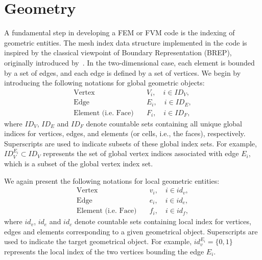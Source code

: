 \section{Geometry}
A fundamental step in developing a FEM or FVM code
is the indexing of geometric entities.
The mesh index data structure implemented in the code is inspired by the classical 
viewpoint of Boundary Representation (BREP), 
originally introduced by~\cite{10.1145/1499949.1500071}.
In the two-dimensional case,
each element is bounded by a set of edges,
and each edge is defined by a set of vertices.
We begin by introducing the following notations for global geometric objects:
\begin{equation}\label{eq:globalgeometricOBJ}
		  \begin{aligned}
					 \text{Vertex} \quad &V_i, \quad i\in ID_V,\\
					 \text{Edge} \quad &E_i, \quad i\in ID_E,\\
					 \text{Element (i.e. Face)}  \quad &F_i, \quad i\in ID_F,
		  \end{aligned}
\end{equation}
where $ID_V$, $ID_E$ and $ID_F$ denote countable 
sets containing all unique global indices for vertices, edges, and elements 
(or cells, i.e., the faces),
respectively. Superscripts are used to indicate subsets of these global index sets. 
For example, 
$ID^{E_i}_{V} \subset ID_{V}$ represents the set of global  
vertex indices associated with edge $E_i$, which is a subset of the global vertex index set.

We again present the following notations
for local geometric entities:
\begin{equation}\label{eq:localgeometricOBJ}
		  \begin{aligned}
					 \text{Vertex} \quad &v_i, \quad i\in id_v,\\
					 \text{Edge} \quad &e_i, \quad i\in id_e,\\
					 \text{Element (i.e. Face)} \quad &f_i, \quad i\in id_f,
		  \end{aligned}
\end{equation}
where $id_v$, $id_e$ and $id_c$ denote countable sets
containing local index for vertices, edges and elements
corresponding to a given geometrical object.
Superscripts are used to indicate the target geometrical object. 
For example,
$id_v^{E_i} = \{0,1\}$ represents the local index of the two vertices 
bounding the edge $E_i$.

